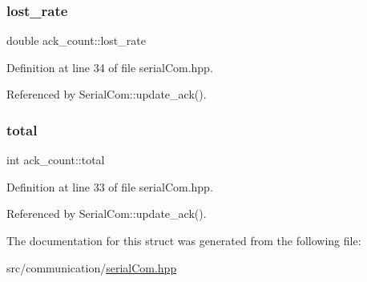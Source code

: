 \mbox{\label{structack__count_a5727e1fe59488611b16b22b82af97e52}} 
\subsubsection{\texorpdfstring{lost\+\_\+rate}{lost\_rate}}
{\footnotesize\ttfamily double ack\+\_\+count\+::lost\+\_\+rate}



Definition at line 34 of file serial\+Com.\+hpp.



Referenced by Serial\+Com\+::update\+\_\+ack().

\mbox{\label{structack__count_acad0aaa27c2d3742cd2d1dec03374cc0}} 
\subsubsection{\texorpdfstring{total}{total}}
{\footnotesize\ttfamily int ack\+\_\+count\+::total}



Definition at line 33 of file serial\+Com.\+hpp.



Referenced by Serial\+Com\+::update\+\_\+ack().



The documentation for this struct was generated from the following file\+:\begin{DoxyCompactItemize}
\item 
src/communication/\hyperlink{serial_com_8hpp}{serial\+Com.\+hpp}\end{DoxyCompactItemize}
